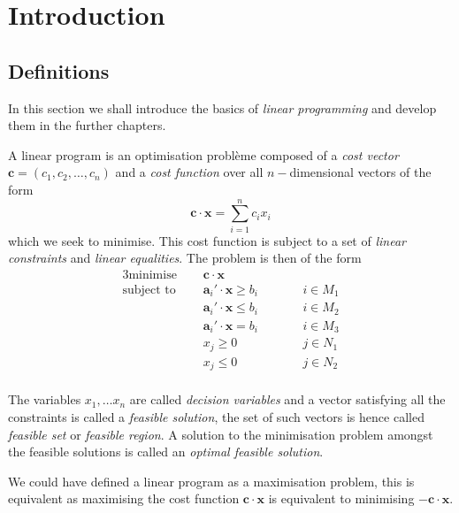 \documentclass[main.tex]{subfiles}
\begin{document}
        \chapter{Introduction}
        \section{Definitions}
        In this section we shall introduce the basics of \emph{linear programming} and develop them in the further chapters.

        \begin{definition}

                A linear program is an optimisation problème composed of a \emph{cost vector} $\mathbf{c} = (c_1, c_2, \ldots, c_n)$ and a \emph{cost function} over all $n-$dimensional vectors of the form \[
                        \mathbf{c} \cdot \mathbf{x} = \sum_{i=1}^{n} c_{i}x_{i}
                \] which we seek to minimise. 
                This cost function is subject to a set of \emph{linear constraints} and \emph{linear equalities}. The problem is then of the form
        \begin{alignat*}{3}
                \text{minimise } \quad & \mathbf{c} \cdot \mathbf{x} \\
                \text{subject to } \quad & \mathbf{a}_{i}' \cdot \mathbf{x} \ge b_{i} \qquad && i \in M_{1} \\
                                  & \mathbf{a}_{i}' \cdot \mathbf{x} \le b_{i} \qquad && i \in M_{2} \\
                                  & \mathbf{a}_{i}' \cdot \mathbf{x} = b_{i} \qquad && i \in M_{3} \\
                                  & x_{j} \ge 0 && j \in N_{1} \\
                                  & x_{j} \le 0 && j \in N_{2} \\
        \end{alignat*}

        The variables $x_1, \ldots x_{n}$ are called \emph{decision variables} and a vector satisfying all the constraints is called a \emph{feasible solution}, the set of such vectors is hence called \emph{feasible set} or \emph{feasible region}. A solution to the minimisation problem amongst the feasible solutions is called an \emph{optimal feasible solution}.
        \end{definition}

        \begin{remark}
                We could have defined a linear program as a maximisation problem, this is equivalent as maximising the cost function $\mathbf{c}\cdot\mathbf{x}$ is equivalent to minimising $-\mathbf{c}\cdot\mathbf{x}$.
        \end{remark}
\end{document}

